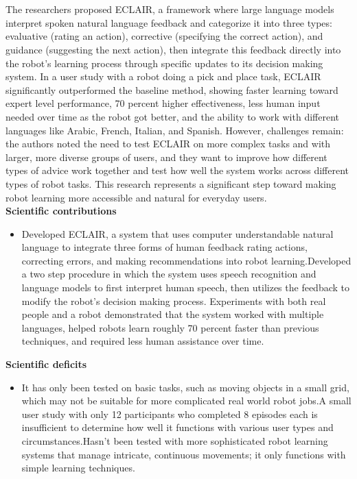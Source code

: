 \documentclass[report.tex]{subfiles}
\begin{document}
\noindent\textbf{}\\\\The researchers proposed ECLAIR, a framework where large language models interpret spoken natural language feedback and categorize it into three types: evaluative (rating an action), corrective (specifying the correct action), and guidance (suggesting the next action), then integrate this feedback directly into the robot's learning process through specific updates to its decision making system. In a user study with a robot doing a pick and place task, ECLAIR significantly outperformed the baseline method, showing faster learning toward expert level performance, 70 percent  higher effectiveness, less human input needed over time as the robot got better, and the ability to work with different languages like Arabic, French, Italian, and Spanish. However, challenges remain: the authors noted the need to test ECLAIR on more complex tasks and with larger, more diverse groups of users, and they want to improve how different types of advice work together and test how well the system works across different types of robot tasks. This research represents a significant step toward making robot learning more accessible and natural for everyday users.\\





\noindent\textbf{Scientific contributions} 
\begin{itemize}
        \item  Developed ECLAIR, a system that uses computer understandable natural language to integrate three forms of human feedback rating actions, correcting errors, and making recommendations into robot learning.Developed a two step procedure in which the system uses speech recognition and language models to first interpret human speech, then utilizes the feedback to modify the robot's decision making process. Experiments with both real people and a robot demonstrated that the system worked with multiple languages, helped robots learn roughly 70 percent  faster than previous techniques, and required less human assistance over time. 
        
\end{itemize}

\noindent\textbf{Scientific deficits} 
\begin{itemize}
        \item     It has only been tested on basic tasks, such as moving objects in a small grid, which may not be suitable for more complicated real world robot jobs.A small user study with only 12 participants who completed 8 episodes each is insufficient to determine how well it functions with various user types and circumstances.Hasn't been tested with more sophisticated robot learning systems that manage intricate, continuous movements; it only functions with simple learning techniques.
\end{itemize}
\end{document}
